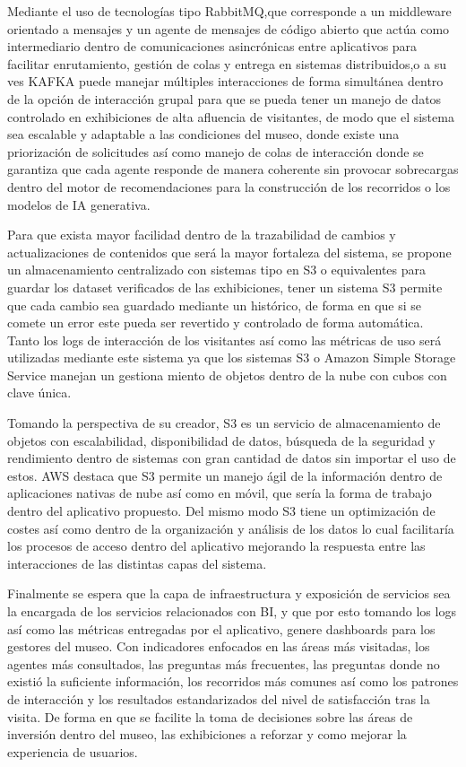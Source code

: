 \documentclass[pdflatex,sn-mathphys-num]{sn-jnl}%
\theoremstyle{thmstyleone}%
\theoremstyle{thmstyletwo}%
\theoremstyle{thmstylethree}%
\begin{document}
Mediante el uso de tecnologías tipo RabbitMQ,que corresponde a un middleware orientado a mensajes y un agente de mensajes de código abierto que actúa como intermediario dentro de comunicaciones asincrónicas entre aplicativos para facilitar enrutamiento, gestión de colas y entrega en sistemas distribuidos,o a su ves KAFKA puede manejar múltiples interacciones de forma simultánea dentro de la opción de interacción grupal para que se pueda tener un manejo de datos controlado en exhibiciones de alta afluencia de visitantes, de modo que el sistema sea escalable y adaptable a las condiciones del museo, donde existe una priorización de solicitudes así como manejo de colas de interacción donde se garantiza que cada agente responde de manera coherente sin provocar sobrecargas dentro del motor de recomendaciones para la construcción de los recorridos o los modelos de IA generativa.

Para que exista mayor facilidad dentro de la trazabilidad de cambios y actualizaciones de contenidos que será la mayor fortaleza del sistema, se propone un almacenamiento centralizado con sistemas tipo en S3 o equivalentes para guardar los dataset verificados de las exhibiciones, tener un sistema S3 permite que cada cambio sea guardado mediante un histórico, de forma en que si se comete un error este pueda ser revertido y controlado de forma automática. Tanto los logs de interacción de los visitantes así como las métricas de uso será utilizadas mediante este sistema ya que los sistemas S3 o Amazon Simple Storage Service  manejan un gestiona miento de objetos dentro de la nube con cubos con clave única.

Tomando la perspectiva de su creador, S3 es un servicio de almacenamiento de objetos con escalabilidad, disponibilidad de datos, búsqueda de la seguridad y rendimiento dentro de sistemas con gran cantidad de datos sin importar el uso de estos. AWS destaca que S3 permite un manejo ágil de la información dentro de aplicaciones nativas de nube así como en móvil, que sería la forma de trabajo dentro del aplicativo propuesto. Del mismo modo S3 tiene un optimización de costes así como dentro de la organización y análisis de los datos lo cual facilitaría los procesos de acceso dentro del aplicativo mejorando la respuesta entre las interacciones de las distintas capas del sistema.\cite{aws_s3}

Finalmente se espera que la capa de infraestructura y exposición de servicios sea la encargada de los servicios relacionados con BI, y que por esto tomando los logs así como las métricas entregadas por el aplicativo, genere dashboards para los gestores del museo. Con indicadores enfocados en las áreas más visitadas, los agentes más consultados, las preguntas más frecuentes, las preguntas donde no existió la suficiente información, los recorridos más comunes así como los patrones de interacción y los resultados estandarizados del nivel de satisfacción tras la visita. De forma en que se facilite la toma de decisiones sobre las áreas de inversión dentro del museo, las exhibiciones a reforzar y como mejorar la experiencia de usuarios.
\end{document}
